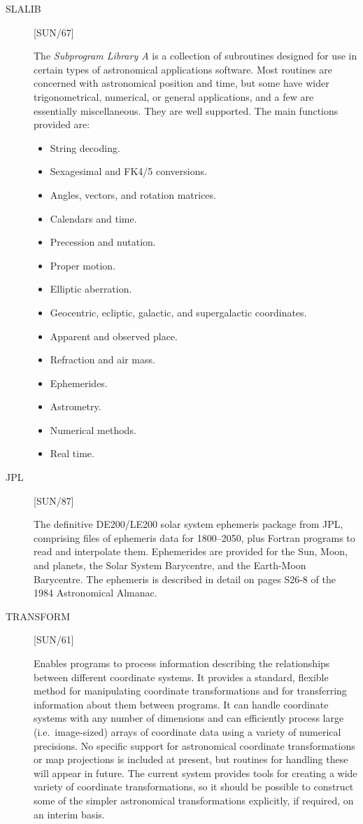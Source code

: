 \begin{description}
\item [SLALIB] \hfill [SUN/67]

The {\it Subprogram Library A} is a collection of subroutines designed for use
in certain types of astronomical applications software.
Most routines are concerned with astronomical position and time, but some have
wider trigonometrical, numerical, or general applications, and a few are
essentially miscellaneous.
They are well supported.
The main functions provided are:
\begin{itemize}
\item String decoding.
\item Sexagesimal and FK4/5 conversions.
\item Angles, vectors, and rotation matrices.
\item Calendars and time.
\item Precession and nutation.
\item Proper motion.
\item Elliptic aberration.
\item Geocentric, ecliptic, galactic, and supergalactic coordinates.
\item Apparent and observed place.
\item Refraction and air mass.
\item Ephemerides.
\item Astrometry.
\item Numerical methods.
\item Real time.
\end{itemize}

\item [JPL] \hfill [SUN/87]

The definitive DE200/LE200 solar system ephemeris package from JPL, comprising
files of ephemeris data for 1800--2050, plus Fortran programs
to read and interpolate them.
Ephemerides are provided for the Sun, Moon, and planets, the Solar System
Barycentre, and the Earth-Moon Barycentre.
The ephemeris is described in detail on pages S26-8 of the 1984 Astronomical
Almanac.

\item [TRANSFORM] \hfill [SUN/61]

Enables programs to process information describing the relationships between
different coordinate systems. 
It provides a standard, flexible method for manipulating coordinate
transformations and for transferring information about them between programs.
It can handle coordinate systems with any number of dimensions and can
efficiently process large (i.e.\ image-sized) arrays of coordinate data using
a variety of numerical precisions. 
No specific support for astronomical coordinate transformations or map
projections is included at present, but routines for handling these will
appear in future.
The current system provides tools for creating a wide variety of coordinate
transformations, so it should be possible to construct some of the simpler
astronomical transformations explicitly, if required, on an interim basis. 


\end{description}
